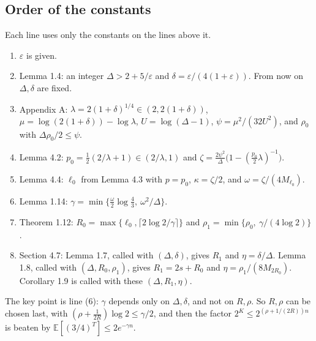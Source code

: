 ﻿\documentclass[10pt,a4paper]{article}
\newcommand{\E}{\mathbb{E}}
\begin{document}
\subsection{Order of the constants}\label{sec:constants}

Each line uses only the constants on the lines above it.

\begin{enumerate}[label=(\arabic*)]
\item \(\varepsilon\) is given.
\item Lemma 1.4: an integer \(\Delta>2+5/\varepsilon\) and
  \(\delta=\varepsilon/(4(1+\varepsilon))\). From now on \(\Delta,\delta\) are
  fixed.
\item Appendix A: \(\lambda=2(1+\delta)^{1/4}\in(2,2(1+\delta))\),
  \(\mu=\log(2(1+\delta))-\log\lambda\), \(U=\log(\Delta-1)\),
  \(\psi=\mu^2/(32U^2)\), and \(\rho_0\) with \(\Delta\rho_0/2\le\psi\).
\item Lemma 4.2: \(p_0=\frac12(2/\lambda+1)\in(2/\lambda,1)\) and
  \(\zeta=\frac{2\psi^2}{\Delta}\bigl(1-(\tfrac{p_0}2\lambda)^{-1}\bigr)\).
\item Lemma 4.4: \(\ell_0\) from Lemma 4.3 with \(p=p_0\), \(\kappa=\zeta/2\),
  and \(\omega=\zeta/(4M_{\ell_0})\).
\item Lemma 1.14: \(\gamma=\min\{\tfrac\omega2\log\tfrac43,\ \omega^2/\Delta\}\).
\item Theorem 1.12: \(R_0=\max\{\ell_0,\lceil2\log2/\gamma\rceil\}\) and
  \(\rho_1=\min\{\rho_0,\ \gamma/(4\log2)\}\).
\item Section 4.7: Lemma 1.7, called with \((\Delta,\delta)\), gives \(R_1\) and
  \(\eta=\delta/\Delta\). Lemma 1.8, called with \((\Delta,R_0,\rho_1)\), gives
  \(R_1=2s+R_0\) and \(\eta=\rho_1/(8M_{2R_0})\). Corollary 1.9 is called with
  these \((\Delta,R_1,\eta)\).
\end{enumerate}

The key point is line (6): \(\gamma\) depends only on \(\Delta,\delta\), and not
on \(R,\rho\). So \(R,\rho\) can be chosen last, with
\((\rho+\tfrac1{2R})\log2\le\gamma/2\), and then the factor
\(2^K\le2^{(\rho+1/(2R))n}\) is beaten by \(\E[(3/4)^T]\le2e^{-\gamma n}\).
\end{document}
